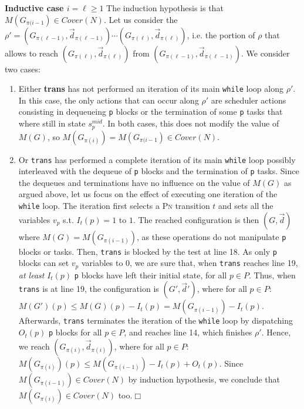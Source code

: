 \documentclass[runningheads,oribibl,]{article}
\newcommand{\pn}{\textsc{Pn}\xspace}
\newcommand{\Cover}{\ensuremath{\textit{Cover}}}
\newcommand{\Reachloss}{\Cover}
\newcommand{\Data}{\ensuremath{\vec{d}}}
\newenvironment{proof}{\noindent{\it Proof.\hspace*{.5cm}}}{}
\newcommand{\qed}{\hfill$\Box$}
\begin{document}
\begin{proof}
  \textbf{Inductive case $i=\ell\geq 1$} The induction hypothesis is
  that $M(G_{\pi(i-1})\in \Reachloss(N)$. Let us consider the
  $\rho'=(G_{\pi(\ell-1)},\Data_{\pi(\ell-1)})\cdots(G_{\pi(\ell)},\Data_{\pi(\ell)})
  $, i.e. the portion of $\rho$ that allows to reach
  $(G_{\pi(\ell)},\Data_{\pi(\ell)})$ from
  $(G_{\pi(\ell-1)},\Data_{\pi(\ell-1)})$. We consider two cases:
  \begin{enumerate}
  \item Either \textbf{trans} has not performed an iteration of its
    main \texttt{while} loop along $\rho'$. In this case, the only
    actions that can occur along $\rho'$ are scheduler actions
    consisting in dequeueing \texttt{p} blocks or the termination of
    some \texttt{p} tasks that where still in state $s^{mid}_p$. In
    both cases, this does not modify the value of $M(G)$, so
    $M(G_{\pi(i)})=M(G_{\pi(i-1})\in \Reachloss(N)$.
  \item Or \texttt{trans} has performed a complete iteration of its
    main \texttt{while} loop possibly interleaved with the dequeue
    of \texttt{p} blocks and the termination of \texttt{p}
    tasks. Since the dequeues and terminations have no influence on
    the value of $M(G)$ as argued above, let us focus on the effect
    of executing one iteration of the \texttt{while} loop. The
    iteration first selects a \pn transition $t$ and sets all the
    variables $v_p$ s.t. $I_t(p)=1$ to $1$. The reached configuration
    is then $(G,\Data)$ where $M(G)=M(G_{\pi(i-1)})$, as these
    operations do not manipulate \texttt{p} blocks or tasks. Then,
    \texttt{trans} is blocked by the test at line 18. As only
    \texttt{p} blocks can set $v_p$ variables to $0$, we are sure
    that, when \texttt{trans} reaches line 19, \emph{at least}
    $I_t(p)$ \texttt{p} blocks have left their initial state, for all
    $p\in P$. Thus, when \texttt{trans} is at line 19, the
    configuration is $(G',\Data')$, where for all $p\in P$:
    $M(G')(p)\leq M(G)(p)-I_t(p)=M(G_{\pi(i-1)})-I_t(p)$. Afterwards,
    \texttt{trans} terminates the iteration of the \texttt{while} loop
    by dispatching $O_t(p)$ \texttt{p} blocks for all $p\in P$, and
    reaches line 14, which finishes $\rho'$. Hence, we reach
    $(G_{\pi(i)},\Data_{\pi(i)})$, where for all $p\in P$:
    $M(G_{\pi(i)})(p)\leq M(G_{\pi(i-1)})-I_t(p)+O_t(p)$. Since
    $M(G_{\pi(i-1)})\in\Reachloss(N)$ by induction hypothesis, we
    conclude that $M(G_{\pi(i)})\in\Reachloss(N)$ too.\qed
  \end{enumerate}

\end{proof}
\end{document}
